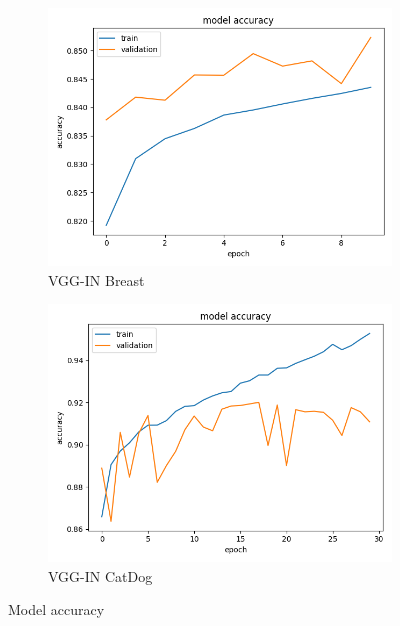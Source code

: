 \begin{figure}
\begin{subfigure}[b]{.45\linewidth}
\includegraphics[width=\linewidth]{Figs/vgg_in_breast_acc.jpg}
\caption{VGG-IN Breast}
\end{subfigure}
\begin{subfigure}[b]{.45\linewidth}
\includegraphics[width=\linewidth]{Figs/vgg_in_catdog_acc.jpg}
\caption{VGG-IN CatDog}
\end{subfigure}

\caption{Model accuracy}
\label{fig:acc2}
\end{figure}
